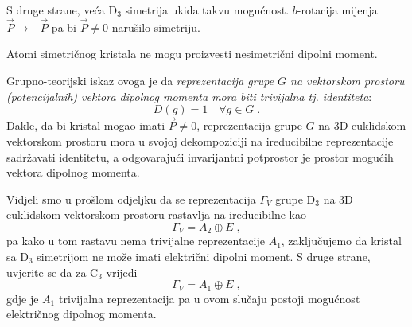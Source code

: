 S druge strane, veća D$_3$ simetrija ukida takvu mogućnost. $b$-rotacija
mijenja $\vec{P}\to-\vec{P}$ pa bi $\vec{P}\neq 0$ narušilo simetriju.

\centerline{}

Atomi simetričnog kristala ne mogu proizvesti nesimetrični dipolni moment.

Grupno-teorijski iskaz ovoga je da \emph{reprezentacija grupe $G$ na vektorskom
prostoru (potencijalnih) vektora dipolnog momenta mora biti trivijalna tj.
identiteta}: 
\begin{displaymath}
   D(g)=1 \quad \forall g\in G \;.
\end{displaymath}
Dakle, da bi kristal mogao imati $\vec{P}\neq 0$, reprezentacija grupe $G$ na 
3D euklidskom vektorskom prostoru mora 
u svojoj dekompoziciji na ireducibilne reprezentacije sadržavati identitetu,
a odgovarajući invarijantni potprostor je prostor mogućih vektora dipolnog momenta.

Vidjeli smo u prošlom odjeljku da se reprezentacija $\Gamma_V$ grupe D$_3$ na 3D
euklidskom vektorskom prostoru rastavlja na ireducibilne kao
\begin{displaymath}
             \Gamma_V = A_2 \oplus E \;,
\end{displaymath}
pa kako u tom rastavu nema trivijalne reprezentacije $A_1$, zaključujemo
da kristal sa D$_3$ simetrijom ne može imati električni dipolni moment.
S druge strane, uvjerite se da za C$_3$ vrijedi
\begin{displaymath}
             \Gamma_V = A_1 \oplus E \;,
\end{displaymath}
gdje je $A_1$ trivijalna reprezentacija
pa u ovom slučaju postoji mogućnost električnog dipolnog momenta.


